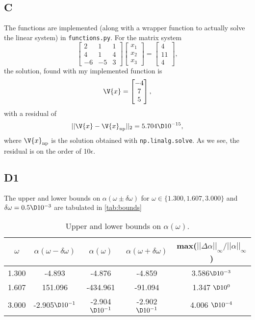 \documentclass[a4paper,10pt]{article}
\begin{document}
	\subsection*{C}
	The functions are implemented (along with a wrapper function to actually solve the linear system) in \texttt{functions.py}. For the matrix system
	\begin{equation}\label{key}
		\begin{bmatrix}
		2 & 1 & 1 \\ 4 & 1 & 4 \\ -6 & -5 & 3
		\end{bmatrix} \begin{bmatrix}
		x_1 \\ x_2 \\ x_3
		\end{bmatrix} = \begin{bmatrix}
		4 \\ 11 \\ 4
		\end{bmatrix},
	\end{equation}
	the solution, found with my implemented function is
	\begin{equation}\label{key}
		\V{x} = \begin{bmatrix}
		-4 \\ 7 \\ 5
		\end{bmatrix},
	\end{equation}
	with a residual of
	\begin{equation}\label{key}
		||\V{x} - \V{x}_{\text{np}}||_2 = 5.704 \D 10^{-15},
	\end{equation}
	where $ \V{x}_{\text{np}} $ is the solution obtained with \texttt{np.linalg.solve}. As we see, the residual is on the order of 10$ \epsilon $.
	
	\subsection*{D1}
	The upper and lower bounds on $ \alpha(\omega\pm \delta \omega) $ for $ \omega \in \{1.300, 1.607, 3.000\} $ and $ \delta \omega = 0.5\D10^{-3} $ are tabulated in \ref{tab:bounds}
	\begin{table}[H]
		\centering
		\begin{tabular}{c|c|c|c|c}
			$ \omega $ & $ \alpha(\omega-\delta \omega) $ & $ \alpha(\omega) $ & $ \alpha(\omega+\delta \omega) $ & max($ ||\Delta\alpha||_{\infty}/||\alpha||_{\infty} $) \\
			\hline
			1.300 & -4.893 & -4.876 & -4.859 & 3.586$ \D10^{-3} $ \\
			1.607 & 151.096 & -434.961 & -91.094 & 1.347 $ \D10^0 $ \\
			3.000 & -2.905$ \D 10^{-1} $ & -2.904 $ \D 10^{-1} $ & -2.902 $ \D 10^{-1} $ & 4.006 $ \D 10^{-4} $
		\end{tabular}
		\caption{Upper and lower bounds on $ \alpha(\omega) $.}
	\end{table}
	
\end{document}

